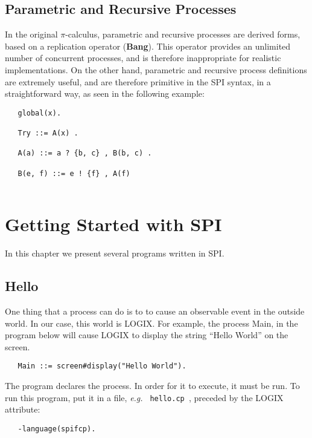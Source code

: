 \section{Parametric and Recursive Processes}

In the original $\pi$-calculus, parametric and recursive processes are
derived forms, based on a replication operator ({\bf Bang}).  This operator
provides an unlimited number of concurrent processes, and is therefore
inappropriate for realistic implementations. On the other hand,
parametric and recursive process definitions are extremely useful, and
are therefore primitive in the SPI syntax, in a straightforward way,
as seen in the following example:

\begin{verbatim}
   global(x).

   Try ::= A(x) .

   A(a) ::= a ? {b, c} , B(b, c) .

   B(e, f) ::= e ! {f} , A(f) 
 
\end{verbatim}


\chapter{Getting Started with SPI}
\label{simple programs}

In this chapter we present several programs written in SPI.

\section{Hello}

One thing that a process can do is to to cause an observable
event in the outside world. In our case, this world is LOGIX.
For example, the process Main, in the program below will cause
LOGIX to display the string ``Hello World'' on the screen.

\begin{verbatim}
   Main ::= screen#display("Hello World").
\end{verbatim}

\noindent

The program declares the process. In order for it to execute,
it must be run.  To run this program, put it in a file,
{\em e.g.} \verb+ hello.cp +, preceded by the LOGIX attribute:

\begin{verbatim}
   -language(spifcp).
\end{verbatim}

